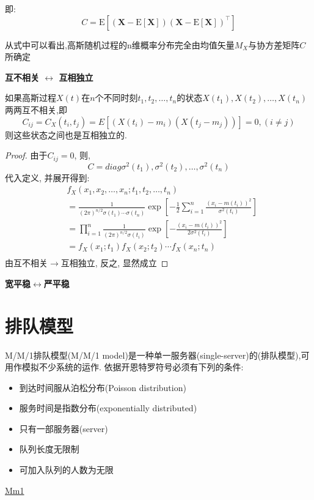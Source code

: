 即:
$$
C=\mathrm{E}
\left[
 \left(
 \textbf{X} - \mathrm{E}[\textbf{X}]
 \right)
 \left(
 \textbf{X} - \mathrm{E}[\textbf{X}]
 \right)^\top
\right]
$$

从式中可以看出,高斯随机过程的n维概率分布完全由均值矢量$M_X$与协方差矩阵$C$所确定

\textbf{互不相关 $\leftrightarrow$ 互相独立}
\begin{theorem}
如果高斯过程$X(t)$在$n$个不同时刻$t_1, t_2, \ldots, t_n$的状态$X(t_1), X(t_2), \ldots, X(t_n)$两两互不相关,即
$$
C_{ij} = C_X(t_i, t_j) = E[(X(t_i) - m_i)(X(t_j - m_j))] = 0, (i \neq j)
$$
则这些状态之间也是互相独立的.
\end{theorem}
\begin{proof}
由于$C_{ij} = 0$, 则, 
$$ C = diag{\sigma^2(t_1), \sigma^2(t_2), \ldots, \sigma^2(t_n)}$$
代入定义, 并展开得到:
$$
\begin{aligned}
& f_X(x_1, x_2, \ldots, x_n; t_1, t_2, \ldots, t_n) \\
& = \frac{1}{(2\pi)^{n/2} \sigma(t_1) \cdots \sigma(t_n)} \exp[-\frac{1}{2} \sum_{i=1}^n \frac{(x_i - m(t_i))^2}{\sigma^2(t_i)}]\\
& = \prod_{i=1}^n \frac{1}{(2\pi)^{n/2} \sigma(t_i)} \exp[-\frac{(x_i - m(t_i))^2}{2 \sigma^2(t_i)}]\\
& = f_X(x_1; t_1) f_X(x_2; t_2) \cdots f_X(x_n; t_n)\\
\end{aligned}
$$
由互不相关$\rightarrow$互相独立, 反之, 显然成立
\end{proof}

\textbf{宽平稳$\leftrightarrow$严平稳}
\begin{theorem}
\end{theorem}

\section{排队模型}
M/M/1排队模型(M/M/1 model)是一种单一服务器(single-server)的(排队模型),可用作模拟不少系统的运作.
依据开恩特罗符号必须有下列的条件:
\begin{itemize}
\item 到达时间服从泊松分布(Poisson distribution)
\item 服务时间是指数分布(exponentially distributed)
\item 只有一部服务器(server)
\item 队列长度无限制
\item 可加入队列的人数为无限
\end{itemize}
\href{http://upload.wikimedia.org/wikipedia/commons/thumb/6/65/Mm1\_queue.svg/292px-Mm1\_queue.svg.png}{Mm1}


